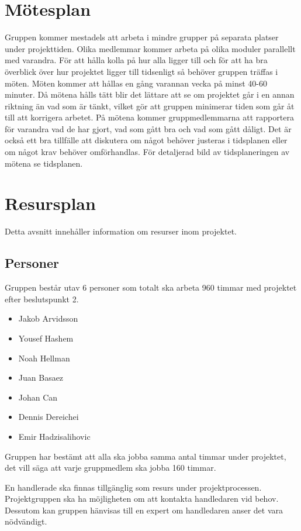 \documentclass[projektplan/plan.tex]{subfiles}
\begin{document}
\section{Mötesplan}
Gruppen kommer mestadels att arbeta i mindre grupper på separata platser under projekttiden. Olika medlemmar kommer arbeta på olika moduler parallellt med varandra. För att hålla kolla på hur alla ligger till och för att ha bra överblick över hur projektet ligger till tidsenligt så behöver gruppen träffas i möten. Möten kommer att hållas en gång varannan vecka på minst 40-60 minuter. Då mötena hålls tätt blir det lättare att se om projektet går i en annan riktning än vad som är tänkt, vilket gör att gruppen minimerar tiden som går åt till att korrigera arbetet. På mötena kommer gruppmedlemmarna att rapportera för varandra vad de har gjort, vad som gått bra och vad som gått dåligt. Det är också ett bra tillfälle att diskutera om något behöver justeras i tidsplanen eller om något krav behöver omförhandlas. För detaljerad bild av tidsplaneringen av mötena se tidsplanen.
\section{Resursplan}
Detta avsnitt innehåller information om resurser inom projektet.
\subsection{Personer}
Gruppen består utav 6 personer som totalt ska arbeta 960 timmar med projektet efter beslutspunkt 2.

\begin{itemize}
\item Jakob Arvidsson
\item Yousef Hashem
\item Noah Hellman
\item Juan Basaez
\item Johan Can
\item Dennis Dereichei
\item Emir Hadzisalihovic
\end{itemize}

Gruppen har bestämt att alla ska jobba samma antal timmar under projektet, det vill säga att varje gruppmedlem ska jobba 160 timmar.
\newline\newline

En handlerade ska finnas tillgänglig som resurs under projektprocessen.
Projektgruppen ska ha möjligheten om att kontakta handledaren vid behov.
Dessutom kan gruppen hänvisas till en expert om handledaren anser det vara  nödvändigt.
\end{document}
